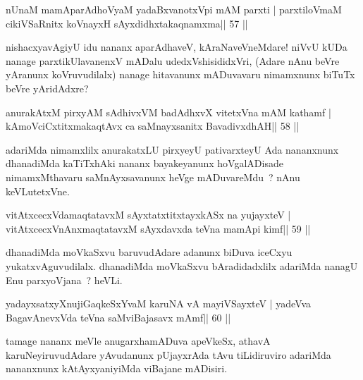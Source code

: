 \begin{shl}
nUnaM mamAparAdhoV\s yaM yadaBxvanotxV\s pi mAM parxti |
parxtiloVmaM cikiVSaRnitx koV\s nayxH sAyxdidhxtakaqnamxma\hfill || 57 ||
\end{shl}

\begin{artha}
nishacxyavAgiyU idu nananx aparAdhaveV, kAraNaveVneMdare! niVvU kUDa
nanage parxtikUlavanenxV mADalu udedxVshisididxVri, (Adare nAnu
beVre yAranunx koVruvudilalx) nanage  hitavanunx mADuvavaru nimamxnunx
biTuTx beVre yAridAdxre?
\end{artha}

\begin{shl}
anurakAtxM pirxyAM sAdhivxVM badAdhxvX vitetxVna mAM kathamf |
kAmoVciCxtitxmakaqtAvx ca saMnayxsanitx BavadivxdhAH\hfill || 58 ||
\end{shl}

\begin{artha}
adariMda nimamxlilx anurakatxLU pirxyeyU pativarxteyU Ada nananxnunx dhanadiMda kaTiTxhAki nananx bayakeyanunx hoVgalADisade nimamxMthavaru saMnAyxsavanunx heVge mADuvareMdu~? nAnu keVLutetxVne.
\end{artha}

\begin{shl}
vitAtxcecxVdamaqtatavxM sAyxtatxtitxtayxkASx na yujayxteV |
vitAtxcecxVnAnxmaqtatavxM sAyxdavxda teVna mamApi kimf\hfill || 59 ||
\end{shl}

\begin{artha}
dhanadiMda moVkaSxvu baruvudAdare adanunx biDuva iceCxyu yukatxvAguvudilalx. dhanadiMda moVkaSxvu bAradidadxlilx adariMda nanagU Enu parxyoVjana~? heVLi.
\end{artha}

\begin{shl}
yadayxsatxyXnujiGaqkeSxYvaM karuNA vA mayiVSayxteV |
yadeVva BagavAnevxVda teVna saMviBajasavx mAmf\hfill || 60 ||
\end{shl}

\begin{artha}
tamage nananx meVle anugarxhamADuva apeVkeSx, athavA karuNeyiruvudAdare yAvudanunx pUjayxrAda tAvu tiLidiruviro adariMda nananxnunx kAtAyxyaniyiMda viBajane mADisiri.
\end{artha}



